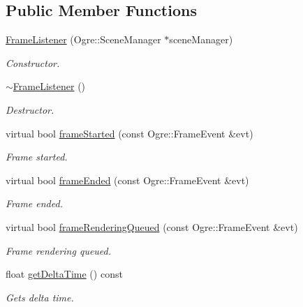 \subsection*{Public Member Functions}
\begin{DoxyCompactItemize}
\item 
\hyperlink{class_graphics_1_1_frame_listener_afebcc6a4dc070985a77fb2182119ca98}{Frame\-Listener} (Ogre\-::\-Scene\-Manager $\ast$scene\-Manager)
\begin{DoxyCompactList}\small\item\em Constructor. \end{DoxyCompactList}\item 
\hypertarget{class_graphics_1_1_frame_listener_a84ee3a42ba673ac10825b25abcef248a}{\hyperlink{class_graphics_1_1_frame_listener_a84ee3a42ba673ac10825b25abcef248a}{$\sim$\-Frame\-Listener} ()}\label{class_graphics_1_1_frame_listener_a84ee3a42ba673ac10825b25abcef248a}

\begin{DoxyCompactList}\small\item\em Destructor. \end{DoxyCompactList}\item 
virtual bool \hyperlink{class_graphics_1_1_frame_listener_aa790d32da6634e931c35b69f779fd42b}{frame\-Started} (const Ogre\-::\-Frame\-Event \&evt)
\begin{DoxyCompactList}\small\item\em Frame started. \end{DoxyCompactList}\item 
virtual bool \hyperlink{class_graphics_1_1_frame_listener_a3aa34e5431cef9ad1d429790914eed60}{frame\-Ended} (const Ogre\-::\-Frame\-Event \&evt)
\begin{DoxyCompactList}\small\item\em Frame ended. \end{DoxyCompactList}\item 
virtual bool \hyperlink{class_graphics_1_1_frame_listener_a1ea51ffd9cfb64758c0bde5d0036a510}{frame\-Rendering\-Queued} (const Ogre\-::\-Frame\-Event \&evt)
\begin{DoxyCompactList}\small\item\em Frame rendering queued. \end{DoxyCompactList}\item 
float \hyperlink{class_graphics_1_1_frame_listener_a2f8f5e7b39811078ec7d735233e41d74}{get\-Delta\-Time} () const 
\begin{DoxyCompactList}\small\item\em Gets delta time. \end{DoxyCompactList}\end{DoxyCompactItemize}


